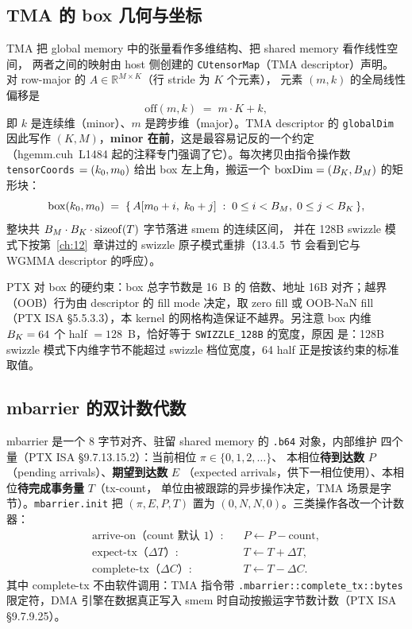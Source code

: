 \subsection{TMA 的 box 几何与坐标}

TMA 把 global memory 中的张量看作多维结构、把 shared memory 看作线性空间，
两者之间的映射由 host 侧创建的 \texttt{CUtensorMap}（TMA descriptor）声明。
对 row-major 的 $A \in \mathbb{R}^{M \times K}$（行 stride 为 $K$ 个元素），
元素 $(m, k)$ 的全局线性偏移是
\begin{equation}
  \mathrm{off}(m, k) \;=\; m \cdot K + k ,
  \label{eq:13-gmem-off}
\end{equation}
即 $k$ 是连续维（minor）、$m$ 是跨步维（major）。TMA descriptor 的
\texttt{globalDim} 因此写作 $(K, M)$，\textbf{minor 在前}，这是最容易记反的一个约定
（hgemm.cuh~L1484 起的注释专门强调了它）。每次拷贝由指令操作数
\texttt{tensor\allowbreak{}Coords} $= (k\sb{0}, m\sb{0})$ 给出 box 左上角，搬运一个
$\mathrm{boxDim} = (B\sb{K}, B\sb{M})$ 的矩形块：
\begin{equation}
  \mathrm{box}(k\sb{0}, m\sb{0}) \;=\; \{\, A[m\sb{0}+i,\; k\sb{0}+j] \;:\;
  0 \le i < B\sb{M},\; 0 \le j < B\sb{K} \,\} ,
\end{equation}
整块共 $B\sb{M} \cdot B\sb{K} \cdot \mathrm{sizeof}(T)$ 字节落进 smem 的连续区间，
并在 128B swizzle 模式下按第~\ref{ch:12}~章讲过的 swizzle 原子模式重排（13.4.5~节
会看到它与 WGMMA descriptor 的呼应）。

PTX 对 box 的硬约束：box 总字节数是 16~B 的
倍数、地址 16B 对齐；越界（OOB）行为由 descriptor 的 fill mode 决定，取 zero fill
或 OOB-NaN fill（PTX ISA §5.5.3.3），本 kernel 的网格构造保证不越界。另注意 box 内维
$B\sb{K} = 64$ 个 half $= 128$~B，恰好等于 \texttt{SWIZZLE\_\allowbreak{}128\allowbreak{}B} 的宽度，原因
是：128B swizzle 模式下内维字节不能超过 swizzle 档位宽度，64 half 正是按该约束的标准取值。

\subsection{mbarrier 的双计数代数}

mbarrier 是一个 8 字节对齐、驻留 shared memory 的 \texttt{.b64} 对象，内部维护
四个量（PTX ISA §9.7.13.15.2）：当前相位 $\pi \in \{0, 1, 2, \dots\}$、
本相位\textbf{待到达数} $P$（pending arrivals）、\textbf{期望到达数} $E$
（expected arrivals，供下一相位使用）、本相位\textbf{待完成事务量} $T$（tx-count，
单位由被跟踪的异步操作决定，TMA 场景是字节）。\texttt{mbarrier.\allowbreak{}init} 把
$(\pi, E, P, T)$ 置为 $(0, N, N, 0)$。三类操作各改一个计数器：
\begin{align}
  \text{arrive-on（count 默认 1）:} \quad & P \leftarrow P - \mathrm{count},
  \label{eq:13-arrive}\\
  \text{expect-tx（}\Delta T\text{）:} \quad & T \leftarrow T + \Delta T,
  \label{eq:13-expect}\\
  \text{complete-tx（}\Delta C\text{）:} \quad & T \leftarrow T - \Delta C .
  \label{eq:13-complete}
\end{align}
其中 complete-tx 不由软件调用：TMA 指令带 \texttt{.mbarrier::\allowbreak{}complete\_\allowbreak{}tx::\allowbreak{}bytes}
限定符，DMA 引擎在数据真正写入 smem 时自动按搬运字节数计数（PTX ISA
§9.7.9.25）。

